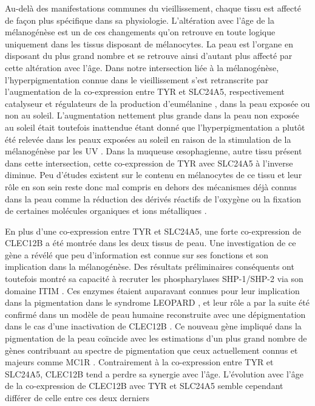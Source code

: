 Au-delà des manifestations communes du vieillissement, chaque tissu est affecté de façon plus spécifique dans sa physiologie. L'altération avec l'âge de la mélanogénèse est un de ces changements qu'on retrouve en toute logique uniquement dans les tissus disposant de mélanocytes. La peau est l'organe en disposant du plus grand nombre et se retrouve ainsi d'autant plus affecté par cette altération avec l'âge. Dans notre intersection liée à la mélanogénèse, l'hyperpigmentation connue dans le vieillissement \cite{Hakozaki2016Sep} s'est retranscrite par l'augmentation de la co-expression entre TYR et SLC24A5, respectivement catalyseur et régulateurs de la production d'eumélanine \cite{Cullinane2011Oct, Ginger2008}, dans la peau exposée ou non au soleil. L'augmentation nettement plus grande dans la peau non exposée au soleil était toutefois inattendue étant donné que l'hyperpigmentation a plutôt été relevée dans les peaux exposées au soleil en raison de la stimulation de la mélanogénèse par les UV \cite{Gilchrest1979}. Dans la muqueuse œsophagienne, autre tissu présent dans cette intersection, cette co-expression de TYR avec SLC24A5 à l'inverse diminue. Peu d'études existent sur le contenu en mélanocytes de ce tissu et leur rôle en son sein reste donc mal compris en dehors des mécanismes déjà connus dans la peau comme la réduction des dérivés réactifs de l'oxygène ou la fixation de certaines molécules organiques et ions métalliques \cite{Tolleson2005}.

En plus d'une co-expression entre TYR et SLC24A5, une forte co-expression de CLEC12B a été montrée dans les deux tissus de peau. Une investigation de ce gène a révélé que peu d'information est connue sur ses fonctions et son implication dans la mélanogénèse. Des résultats préliminaires conséquents ont toutefois montré sa capacité à recruter les phospharylases SHP-1/SHP-2 via son domaine ITIM \cite{Sormani2019}. Ces enzymes étaient auparavant connues pour leur implication dans la pigmentation dans le syndrome LEOPARD \cite{Motegi2015}, et leur rôle a par la suite été confirmé dans un modèle de peau humaine reconstruite avec une dépigmentation dans le cas d'une inactivation de CLEC12B \cite{Sormani2019}. Ce nouveau gène impliqué dans la pigmentation de la peau coïncide avec les estimations d'un plus grand nombre de gènes contribuant au spectre de pigmentation que ceux actuellement connus et majeurs comme MC1R \cite{Parra2004Nov}. 
Contrairement à la co-expression entre TYR et SLC24A5, CLEC12B tend a perdre sa synergie avec l'âge.
L'évolution avec l'âge de la co-expression de CLEC12B avec TYR et SLC24A5 semble cependant différer de celle entre ces deux derniers 



